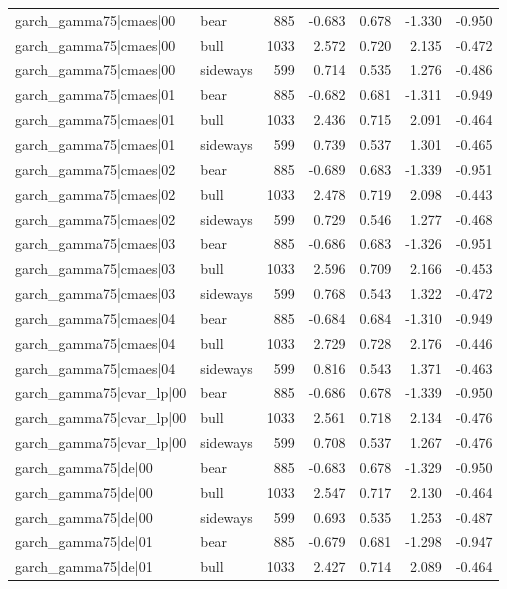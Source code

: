 \begin{table}
\begin{tabular}{llrrrrr}
garch\_gamma75|cmaes|00 & bear & 885 & -0.683 & 0.678 & -1.330 & -0.950 \\
garch\_gamma75|cmaes|00 & bull & 1033 & 2.572 & 0.720 & 2.135 & -0.472 \\
garch\_gamma75|cmaes|00 & sideways & 599 & 0.714 & 0.535 & 1.276 & -0.486 \\
garch\_gamma75|cmaes|01 & bear & 885 & -0.682 & 0.681 & -1.311 & -0.949 \\
garch\_gamma75|cmaes|01 & bull & 1033 & 2.436 & 0.715 & 2.091 & -0.464 \\
garch\_gamma75|cmaes|01 & sideways & 599 & 0.739 & 0.537 & 1.301 & -0.465 \\
garch\_gamma75|cmaes|02 & bear & 885 & -0.689 & 0.683 & -1.339 & -0.951 \\
garch\_gamma75|cmaes|02 & bull & 1033 & 2.478 & 0.719 & 2.098 & -0.443 \\
garch\_gamma75|cmaes|02 & sideways & 599 & 0.729 & 0.546 & 1.277 & -0.468 \\
garch\_gamma75|cmaes|03 & bear & 885 & -0.686 & 0.683 & -1.326 & -0.951 \\
garch\_gamma75|cmaes|03 & bull & 1033 & 2.596 & 0.709 & 2.166 & -0.453 \\
garch\_gamma75|cmaes|03 & sideways & 599 & 0.768 & 0.543 & 1.322 & -0.472 \\
garch\_gamma75|cmaes|04 & bear & 885 & -0.684 & 0.684 & -1.310 & -0.949 \\
garch\_gamma75|cmaes|04 & bull & 1033 & 2.729 & 0.728 & 2.176 & -0.446 \\
garch\_gamma75|cmaes|04 & sideways & 599 & 0.816 & 0.543 & 1.371 & -0.463 \\
garch\_gamma75|cvar\_lp|00 & bear & 885 & -0.686 & 0.678 & -1.339 & -0.950 \\
garch\_gamma75|cvar\_lp|00 & bull & 1033 & 2.561 & 0.718 & 2.134 & -0.476 \\
garch\_gamma75|cvar\_lp|00 & sideways & 599 & 0.708 & 0.537 & 1.267 & -0.476 \\
garch\_gamma75|de|00 & bear & 885 & -0.683 & 0.678 & -1.329 & -0.950 \\
garch\_gamma75|de|00 & bull & 1033 & 2.547 & 0.717 & 2.130 & -0.464 \\
garch\_gamma75|de|00 & sideways & 599 & 0.693 & 0.535 & 1.253 & -0.487 \\
garch\_gamma75|de|01 & bear & 885 & -0.679 & 0.681 & -1.298 & -0.947 \\
garch\_gamma75|de|01 & bull & 1033 & 2.427 & 0.714 & 2.089 & -0.464 \\

\end{tabular}
\end{table}
